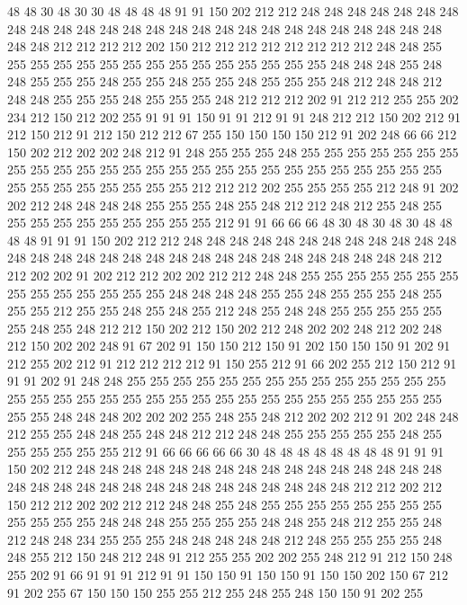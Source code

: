 48 48 30 48 30 30 48 48 48 48 91 91 150 202 212 212 248 248 248 248
248 248 248 248 248 248 248 248 248 248 248 248 248 248 248 248 248 248 248 248
248 248 248 248 212 212 212 212 202 150 212 212 212 212 212 212 212 212 248 248
255 255 255 255 255 255 255 255 255 255 255 255 255 255 255 248 248 248 255 248
248 255 255 255 248 255 255 248 255 255 248 255 255 255 248 212 248 248 212 248
248 255 255 255 248 255 255 255 248 212 212 212 202 91 212 212 255 255 202 234
212 150 212 202 255 91 91 91 150 91 91 212 91 91 248 212 212 150 202 212
91 212 150 212 91 212 150 212 212 67 255 150 150 150 150 212 91 202 248 66
66 212 150 202 212 202 202 248 212 91 248 255 255 255 248 255 255 255 255 255
255 255 255 255 255 255 255 255 255 255 255 255 255 255 255 255 255 255 255 255
255 255 255 255 255 255 255 255 255 212 212 212 202 255 255 255 255 212 248 91
202 202 212 248 248 248 248 255 255 255 248 255 248 212 212 248 212 255 248 255
255 255 255 255 255 255 255 255 255 212 91 91 66 66 66 48 30 48 30 48
30 48 48 48 48 91 91 91 150 202 212 212 248 248 248 248 248 248 248 248
248 248 248 248 248 248 248 248 248 248 248 248 248 248 248 248 248 248 248 248
248 248 212 212 202 202 91 202 212 212 202 202 212 212 248 248 255 255 255 255
255 255 255 255 255 255 255 255 255 255 248 248 248 248 255 255 248 255 255 255
248 255 255 255 212 255 255 248 255 248 255 212 248 255 248 248 255 255 255 255
255 255 248 255 248 212 212 150 202 212 150 202 212 248 202 202 248 212 202 248
212 150 202 202 248 91 67 202 91 150 150 212 150 91 202 150 150 150 91 202
91 212 255 202 212 91 212 212 212 212 91 150 255 212 91 66 202 255 212 150
212 91 91 91 202 91 248 248 255 255 255 255 255 255 255 255 255 255 255 255
255 255 255 255 255 255 255 255 255 255 255 255 255 255 255 255 255 255 255 255
255 255 255 248 248 248 202 202 202 255 248 255 248 212 202 202 212 91 202 248
248 212 255 255 248 248 255 248 248 212 212 248 248 255 255 255 255 255 248 255
255 255 255 255 255 212 91 66 66 66 66 66 30 48 48 48 48 48 48 48
48 91 91 91 150 202 212 248 248 248 248 248 248 248 248 248 248 248 248 248
248 248 248 248 248 248 248 248 248 248 248 248 248 248 248 248 248 248 212 212
202 212 150 212 212 202 202 212 212 248 248 255 248 255 255 255 255 255 255 255
255 255 255 255 255 248 248 248 255 255 255 255 248 248 255 248 212 255 255 248
212 248 248 234 255 255 255 248 248 248 248 248 212 248 255 255 255 255 248 248
255 212 150 248 212 248 91 212 255 255 202 202 255 248 212 91 212 150 248 255
202 91 66 91 91 91 212 91 91 150 150 91 150 150 91 150 150 202 150 67
212 91 202 255 67 150 150 150 255 255 212 255 248 255 248 150 150 91 202 255

